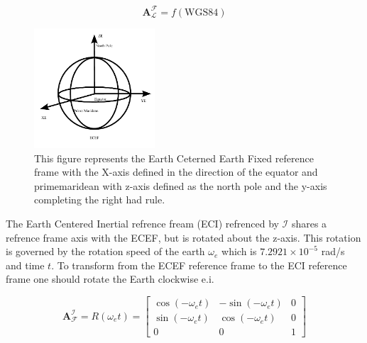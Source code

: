 \begin{equation}
        \mathbf{A}_{\mathcal{L}}^{\mathcal{F}} = f(\text{WGS84})
\end{equation}

\begin{figure}[H]
    \centering
    \includegraphics[width=0.4\textwidth]{figures/modelling/ECEF.pdf}
    \caption{This figure represents the Earth Ceterned Earth Fixed reference frame with the X-axis defined in the direction of the equator and primemaridean
    with z-axis defined as the north pole and the y-axis completing the right had rule.}
    \label{fig:ECEFRF}
\end{figure}


The Earth Centered Inertial refrence fream (ECI) refrenced by $\mathcal{I}$ shares a refrence frame axis with the ECEF, but is rotated about the z-axis. This rotation is governed
by the rotation speed of the earth $\omega_e$ which is $7.2921\times10^{-5}$ rad/s and time $t$. To transform from the ECEF reference frame to the ECI reference frame one should
rotate the Earth clockwise e.i. 

\begin{equation}
    \mathbf{A}_{\mathcal{F}}^{\mathcal{I}} = R(\omega_e t) = 
    \begin{bmatrix}
        \cos(-\omega_e t) & -\sin(-\omega_e t) & 0\\
        \sin(-\omega_e t) & \cos(-\omega_e t) & 0\\
        0 & 0 & 1
    \end{bmatrix}
\end{equation}

